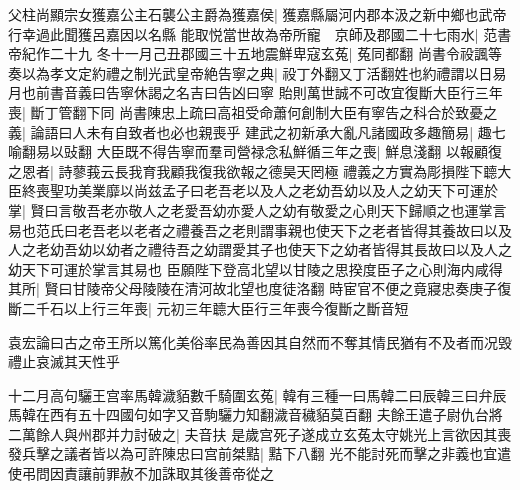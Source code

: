 父柱尚顯宗女獲嘉公主石襲公主爵為獲嘉侯|{
	獲嘉縣屬河内郡本汲之新中鄉也武帝行幸過此聞獲呂嘉因以名縣}
能取悦當世故為帝所寵　京師及郡國二十七雨水|{
	范書帝紀作二十九}
冬十一月己丑郡國三十五地震鮮卑寇玄菟|{
	菟同都翻}
尚書令祋諷等奏以為孝文定約禮之制光武皇帝絶告寧之典|{
	祋丁外翻又丁活翻姓也約禮謂以日易月也前書音義曰告寧休謁之名吉曰告凶曰寧}
貽則萬世誠不可改宜復斷大臣行三年喪|{
	斷丁管翻下同}
尚書陳忠上疏曰高祖受命蕭何創制大臣有寧告之科合於致憂之義|{
	論語曰人未有自致者也必也親喪乎}
建武之初新承大亂凡諸國政多趣簡易|{
	趣七喻翻易以䜴翻}
大臣既不得告寧而羣司營禄念私鮮循三年之喪|{
	鮮息淺翻}
以報顧復之恩者|{
	詩蓼莪云長我育我顧我復我欲報之德昊天罔極}
禮義之方實為彫損陛下聼大臣終喪聖功美業靡以尚兹孟子曰老吾老以及人之老幼吾幼以及人之幼天下可運於掌|{
	賢曰言敬吾老亦敬人之老愛吾幼亦愛人之幼有敬愛之心則天下歸順之也運掌言易也范氏曰老吾老以老者之禮養吾之老則謂事親也使天下之老者皆得其養故曰以及人之老幼吾幼以幼者之禮待吾之幼謂愛其子也使天下之幼者皆得其長故曰以及人之幼天下可運於掌言其易也}
臣願陛下登高北望以甘陵之思揆度臣子之心則海内咸得其所|{
	賢曰甘陵帝父母陵陵在清河故北望也度徒洛翻}
時宦官不便之竟寢忠奏庚子復斷二千石以上行三年喪|{
	元初三年聼大臣行三年喪今復斷之斷音短}


袁宏論曰古之帝王所以篤化美俗率民為善因其自然而不奪其情民猶有不及者而况毁禮止哀滅其天性乎

十二月高句驪王宫率馬韓濊貊數千騎圍玄菟|{
	韓有三種一曰馬韓二曰辰韓三曰弁辰馬韓在西有五十四國句如字又音駒驪力知翻濊音穢貊莫百翻}
夫餘王遣子尉仇台將二萬餘人與州郡并力討破之|{
	夫音扶}
是歲宫死子遂成立玄菟太守姚光上言欲因其喪發兵擊之議者皆以為可許陳忠曰宫前桀黠|{
	黠下八翻}
光不能討死而擊之非義也宜遣使弔問因責讓前罪赦不加誅取其後善帝從之

